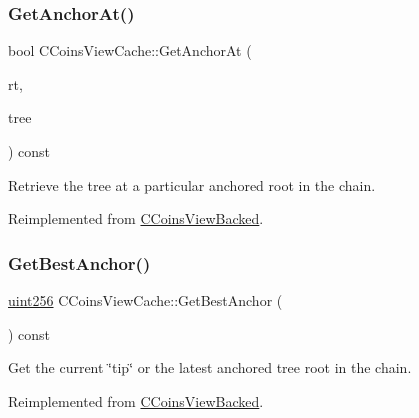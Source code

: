 \subsubsection{\texorpdfstring{Get\+Anchor\+At()}{GetAnchorAt()}}
{\footnotesize\ttfamily bool C\+Coins\+View\+Cache\+::\+Get\+Anchor\+At (\begin{DoxyParamCaption}\item[{const \mbox{\hyperlink{classuint256}{uint256}} \&}]{rt,  }\item[{Z\+C\+Incremental\+Merkle\+Tree \&}]{tree }\end{DoxyParamCaption}) const\hspace{0.3cm}{\ttfamily [virtual]}}



Retrieve the tree at a particular anchored root in the chain. 



Reimplemented from \mbox{\hyperlink{class_c_coins_view_backed_a85e573aed0a7e713dc5d6a0478649435}{C\+Coins\+View\+Backed}}.

\mbox{\label{class_c_coins_view_cache_a8f1e864bff1617bae243bd0c7b29d2ed}} 
\subsubsection{\texorpdfstring{Get\+Best\+Anchor()}{GetBestAnchor()}}
{\footnotesize\ttfamily \mbox{\hyperlink{classuint256}{uint256}} C\+Coins\+View\+Cache\+::\+Get\+Best\+Anchor (\begin{DoxyParamCaption}{ }\end{DoxyParamCaption}) const\hspace{0.3cm}{\ttfamily [virtual]}}



Get the current \char`\"{}tip\char`\"{} or the latest anchored tree root in the chain. 



Reimplemented from \mbox{\hyperlink{class_c_coins_view_backed_a2bac0f246916a004e9773f03c37f2c82}{C\+Coins\+View\+Backed}}.

\mbox{\label{class_c_coins_view_cache_a1190c94a943c067d13211179ef06470b}} 

